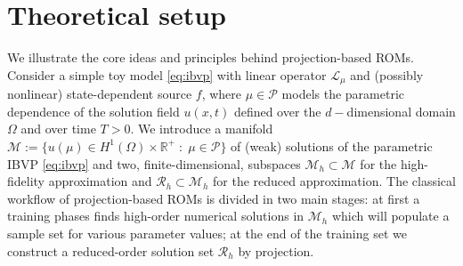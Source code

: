 \documentclass[../main.tex]{subfiles}
\begin{document}
\section{Theoretical setup}\label{sec:setup}

We illustrate the core ideas and principles behind projection-based ROMs. 
Consider a simple toy model \eqref{eq:ibvp} with linear operator $\mathcal{L}_{\mu}$ and (possibly nonlinear) state-dependent source $f$, where $\mu\in\mathcal{P}$ models the parametric dependence of the solution field $u(x,t)$ defined over the $d-$dimensional domain $\Omega$ and over time $T>0$.
We introduce a manifold $\mathcal{M}:=\{u(\mu)\in H^{1}(\Omega)\times\mathbb{R}^{+}\;:\; \mu\in \mathcal{P}\}$ of (weak) solutions of the parametric IBVP \eqref{eq:ibvp} and two, finite-dimensional, subspaces $\mathcal{M}_{h} \subset \mathcal{M}$ for the high-fidelity approximation and $\mathcal{R}_{h} \subset \mathcal{M}_{h}$ for the reduced approximation.
The classical workflow of projection-based ROMs is divided in two main stages: at first a training phases finds high-order numerical solutions in $\mathcal{M}_{h}$ which will populate a sample set for various parameter values; at the end of the training set we construct a reduced-order solution set $\mathcal{R}_{h}$ by projection.




\end{document}
